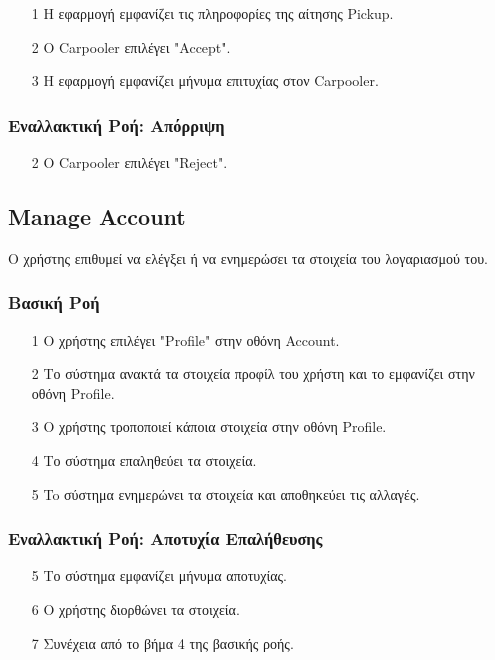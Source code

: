 \begin{enumerate}
    \item[1] Η εφαρμογή εμφανίζει τις πληροφορίες της αίτησης Pickup.
    \item[2] Ο Carpooler επιλέγει "Accept".
    \item[3] Η εφαρμογή εμφανίζει μήνυμα επιτυχίας στον Carpooler.
\end{enumerate}

\subsubsection{Εναλλακτική Ροή: Απόρριψη}

\begin{enumerate}
    \item[2] Ο Carpooler επιλέγει "Reject".
\end{enumerate}

\subsection{Manage Account}
\label{uc:manage-account}

Ο χρήστης επιθυμεί να ελέγξει ή να ενημερώσει τα στοιχεία του λογαριασμού του.

\subsubsection{Βασική Ροή}

\begin{enumerate}
    \item[1] Ο χρήστης επιλέγει "Profile" στην οθόνη Account.
    \item[2] Το σύστημα ανακτά τα στοιχεία προφίλ του χρήστη και το εμφανίζει στην οθόνη Profile.
    \item[3] Ο χρήστης τροποποιεί κάποια στοιχεία στην οθόνη Profile.
    \item[4] Το σύστημα επαληθεύει τα στοιχεία.
    \item[5] To σύστημα ενημερώνει τα στοιχεία και αποθηκεύει τις αλλαγές.
\end{enumerate}

\subsubsection{Εναλλακτική Ροή: Αποτυχία Επαλήθευσης}

\begin{enumerate}
    \item[5] Το σύστημα εμφανίζει μήνυμα αποτυχίας.
    \item[6] Ο χρήστης διορθώνει τα στοιχεία.
    \item[7] Συνέχεια από το βήμα 4 της βασικής ροής.
\end{enumerate}

